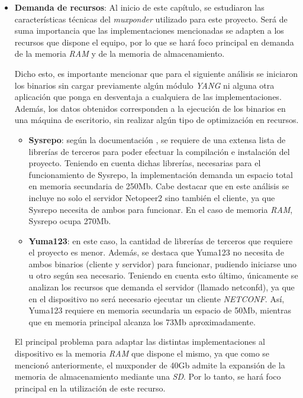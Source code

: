 \begin{itemize}
	\item \textbf{Demanda de recursos}: Al inicio de este capítulo, se estudiaron las características técnicas del \textit{muxponder} utilizado para este proyecto. Será de suma importancia que las implementaciones mencionadas se adapten a los recursos que dispone el equipo, por lo que se hará foco principal en demanda de la memoria \textit{RAM} y de la memoria de almacenamiento. 
	
	Dicho esto, es importante mencionar que para el siguiente análisis se iniciaron los binarios sin cargar previamente algún módulo \textit{YANG} ni alguna otra aplicación que ponga en desventaja a cualquiera de las implementaciones. Además, los datos obtenidos corresponden a la ejecución de los binarios en una máquina de escritorio, sin realizar algún tipo de optimización en recursos.

	\begin{itemize}
		\item \textbf{Sysrepo}: según la documentación \parencite{sysrepoinstall}, se requiere de una extensa lista de librerías de terceros para poder efectuar la compilación e instalación del proyecto. Teniendo en cuenta dichas librerías, necesarias para el funcionamiento de Sysrepo, la implementación demanda un espacio total en memoria secundaria de 250Mb. Cabe destacar que en este análisis se incluye no solo el servidor Netopeer2 sino también el cliente, ya que Sysrepo necesita de ambos para funcionar. En el caso de memoria \textit{RAM}, Sysrepo ocupa 270Mb.

		\item \textbf{Yuma123}: en este caso, la cantidad de librerías de terceros que requiere el proyecto \parencite{yuma123} es menor. Además, se destaca que Yuma123 no necesita de ambos binarios (cliente y servidor) para funcionar, pudiendo iniciarse uno u otro según sea necesario. Teniendo en cuenta esto último, únicamente se analizan los recursos que demanda el servidor (llamado netconfd), ya que en el dispositivo no será necesario ejecutar un cliente \textit{NETCONF}. Así, Yuma123 requiere en memoria secundaria un espacio de 50Mb, mientras que en memoria principal alcanza los 73Mb aproximadamente.

	\end{itemize}
	
	El principal problema para adaptar las distintas implementaciones al dispositivo es la memoria \textit{RAM} que dispone el mismo, ya que como se mencionó anteriormente, el muxponder de 40Gb admite la expansión de la memoria de almacenamiento mediante una \textit{SD}. Por lo tanto, se hará foco principal en la utilización de este recurso.
	

\end{itemize}
